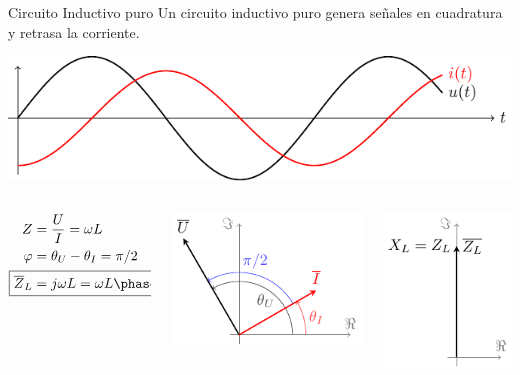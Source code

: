 \documentclass[aspectratio=169, usenames,svgnames,dvipsnames]{beamer}
\begin{document}
\begin{frame}[label={sec:org3fca40b}]{Circuito Inductivo puro}
Un circuito inductivo puro genera \alert{señales en cuadratura} y \alert{retrasa la corriente}.

\begin{center}
\includegraphics[height=0.3\textheight]{../figs/inductivoPuro.pdf}
\end{center}

\begin{columns}
\begin{column}{0.3\columnwidth}
\begin{align*}
  Z &= \dfrac{U}{I} = \omega L\\
  \varphi &= \theta_U - \theta_I = \pi/2\\
  \Aboxed{\overline{Z}_L &= j\omega L = \omega L \phase{\ang{90}}}
\end{align*}
\end{column}


\begin{column}{0.4\columnwidth}
\begin{center}
\includegraphics[height=0.4\textheight]{../figs/fasorInductancia_VI.pdf}
\end{center}
\end{column}


\begin{column}{0.3\columnwidth}
\begin{center}
\includegraphics[height=0.4\textheight]{../figs/fasorInductancia.pdf}
\end{center}
\end{column}
\end{columns}
\end{frame}
\end{document}
